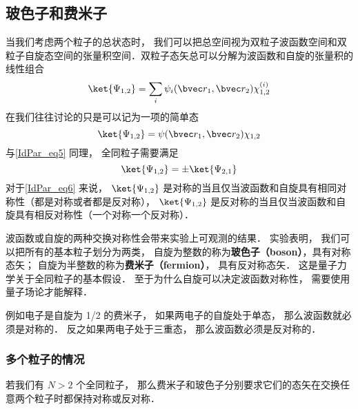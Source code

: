 \subsection{玻色子和费米子}
当我们考虑两个粒子的总状态时， 我们可以把总空间视为双粒子波函数空间和双粒子自旋态空间的张量积空间．双粒子态矢总可以分解为波函数和自旋的张量积的线性组合 %
\begin{equation}
\ket{\Psi_{1,2}} = \sum_i \psi_i(\bvec r_1, \bvec r_2) \chi^{(i)}_{1,2}
\end{equation}
在我们往往讨论的只是可以记为一项的简单态
\begin{equation}\label{IdPar_eq6}
\ket{\Psi_{1,2}} = \psi(\bvec r_1, \bvec r_2) \chi_{1,2}
\end{equation}
与\autoref{IdPar_eq5} 同理， 全同粒子需要满足
\begin{equation}\label{IdPar_eq4}
\ket{\Psi_{1,2}} = \pm \ket{\Psi_{2,1}}
\end{equation}
对于\autoref{IdPar_eq6} 来说， $\ket{\Psi_{1,2}}$ 是对称的当且仅当波函数和自旋具有相同对称性（都是对称或者都是反对称）， $\ket{\Psi_{1,2}}$ 是反对称的当且仅当波函数和自旋具有相反对称性（一个对称一个反对称）．

波函数或自旋的两种交换对称性会带来实验上可观测的结果． 实验表明， 我们可以把所有的基本粒子划分为两类， 自旋为整数的称为\textbf{玻色子（boson）}，具有对称态矢； 自旋为半整数的称为\textbf{费米子（fermion）}， 具有反对称态矢． 这是量子力学关于全同粒子的基本假设． 至于为什么自旋可以决定波函数对称性， 需要使用量子场论才能解释． %

例如电子是自旋为 1/2 的费米子， 如果两电子的自旋处于单态， 那么波函数就必须是对称的． 反之如果两电子处于三重态， 那么波函数必须是反对称的．

\subsubsection{多个粒子的情况}
若我们有 $N > 2$ 个全同粒子， 那么费米子和玻色子分别要求它们的态矢在交换任意两个粒子时都保持对称或反对称．
